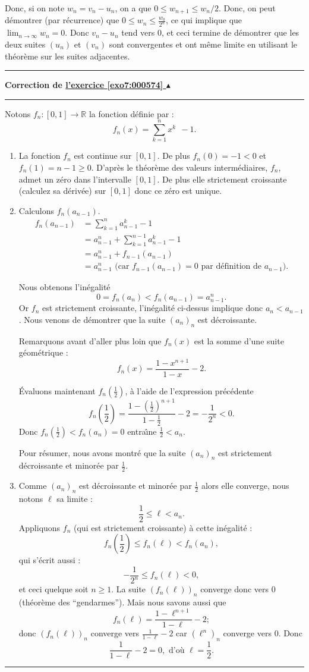 \documentclass[11pt,a4paper]{article}
\newcommand{\Rr}{\mathbb{R}} \newcommand{\R}{\mathbb{R}}
\renewcommand{\le}{\leqslant} \renewcommand{\leq}{\leqslant}
\newcounter{exo}
\newcommand{\correction}[1]{\hypertarget{cor7:#1}{}\label{cor7:#1}{\bf Correction de \hyperlink{exo7:#1}{l'exercice \ref{exo7:#1} $\blacktriangle$}}\vspace{1mm}\hrule\vspace{1mm}}
\newcommand{\fincorrection}{\vspace{1mm}\hrule\vspace*{7mm}}
\begin{document}
Donc, si on note $w_n= v_n-u_n$, on a que $0\leqslant w_{n+1}\leqslant w_n/2$.
Donc, on peut d\'emontrer (par r\'ecurrence) que $0\leqslant w_n\le
\frac{w_0}{2^n}$, ce qui implique que $\lim_{n\rightarrow\infty}w_n=0$.
Donc $v_n-u_n$ tend vers 0, et ceci termine de d\'emontrer que les
deux suites $(u_n)$ et $(v_n)$ sont convergentes et ont m\^eme limite
en utilisant le th\'eor\`eme sur les suites adjacentes.
\fincorrection
\correction{000574}
Notons $f_n : [0,1] \longrightarrow \Rr$ la fonction d\'efinie par :
$$ f_n(x) = \sum_{k=1}^n x^k \ \ - 1.$$
\begin{enumerate}
  \item La fonction $f_n$ est continue
sur $[0,1]$. De plus $f_n(0) = -1 < 0$ et $f_n(1) = n-1\geqslant 0$.
D'apr\`es le th\'eor\`eme des valeurs interm\'ediaires, $f_n$, admet un
z\'ero dans l'intervalle $[0,1]$. De plus elle strictement
croissante (calculez sa d\'eriv\'ee) sur $[0,1]$ donc ce z\'ero est
unique.
  \item Calculons $f_n(a_{n-1})$.
\begin{align*}
f_n(a_{n-1}) &= \sum_{k=1}^{n} a_{n-1}^k  - 1 \\
     &= a_{n-1}^n + \sum_{k=1}^{n-1} a_{n-1}^k  - 1 \\
     &= a_{n-1}^n + f_{n-1}(a_{n-1})  \\
     &= a_{n-1}^n \text{\ \  (car $f_{n-1}(a_{n-1})=0$ par d\'efinition de $a_{n-1}$).}
\end{align*}

Nous obtenons l'in\'egalit\'e
$$ 0 = f_n(a_n) < f_n(a_{n-1}) = a_{n-1}^n.$$
Or $f_n$ est strictement croissante, l'in\'egalit\'e ci-dessus
implique donc $ a_n < a_{n-1}$.
Nous venons de d\'emontrer que la suite $(a_n)_n$ est d\'ecroissante.


Remarquons avant d'aller plus loin que $f_n(x)$ est la somme d'une
suite g\'eom\'etrique :
$$f_n(x) = \frac{1-x^{n+1}}{1-x}-2.$$

\'Evaluons maintenant $f_n(\frac12)$, \`a l'aide de l'expression
pr\'ec\'edente
$$f_n(\frac12) = \frac{1-(\frac12)^{n+1}}{1-{\frac12}}-2 = -\frac 1 {2^n} < 0.$$
Donc $ f_n(\frac12) < f_n(a_n)=0$ entra\^{\i}ne $\frac12 < a_n$.

Pour r\'esumer, nous avons montré que la suite $(a_n)_n$ est
strictement d\'ecroissante et minor\'ee par $\frac12$.

\item Comme $(a_n)_n$ est
d\'ecroissante et minor\'ee par $\frac12$ alors elle converge, nous
notons $\ell$ sa limite :
$$ \frac 12 \leqslant \ell < a_n.$$
Appliquons $f_n$ (qui est strictement croissante) \`a cette
in\'egalit\'e :
 $$ f_n\left(\frac 12\right) \leqslant f_n(\ell) < f_n(a_n),$$
qui s'\'ecrit aussi :
$$ -\frac 1 {2^n} \leqslant f_n(\ell) < 0,$$
et ceci quelque soit $n\geqslant 1$. La suite $(f_n(\ell))_n$ converge
donc vers $0$ (th\'eor\`eme des  ``gendarmes''). Mais nous savons
aussi que
$$f_n(\ell) = \frac{1-\ell^{n+1}}{1-\ell}-2 ;$$
donc $(f_n(\ell))_n$ converge vers $\frac{1}{1-\ell}-2$ car
$(\ell^n)_n$ converge vers $0$. Donc
$$\frac{1}{1-\ell}-2 = 0, \text{ d'o\`u } \ell = \frac12.$$
\end{enumerate}
\fincorrection
\end{document}
